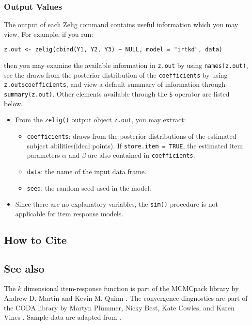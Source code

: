 \subsubsection{Output Values}

The output of each Zelig command contains useful information which you may
view. For example, if you run:
\begin{verbatim}
z.out <- zelig(cbind(Y1, Y2, Y3) ~ NULL, model = "irtkd", data)
\end{verbatim}
\noindent then you may examine the available information in \texttt{z.out} by
using \texttt{names(z.out)}, see the draws from the posterior distribution of
the \texttt{coefficients} by using \texttt{z.out\$coefficients}, and view 
a default summary of information through \texttt{summary(z.out)}. 
Other elements available through the \texttt{\$} operator are listed below.

\begin{itemize}

\item From the \texttt{zelig()} output object \texttt{z.out}, you may extract:

\begin{itemize}
\item \texttt{coefficients}: draws from the posterior distributions
of the estimated subject abilities(ideal points). If 
\texttt{store.item = TRUE}, the estimated item parameters $\alpha$ and $\beta$
 are also contained in \texttt{coefficients}.

\item \texttt{data}: the name of the input data frame.
\item \texttt{seed}: the random seed used in the model.   

\end{itemize}

\item Since there are no explanatory variables, the \texttt{sim()}
procedure is not applicable for item response models.

\end{itemize}

\subsection*{How to Cite}


\subsection*{See also}
The $k$ dimensional item-response function is part of the MCMCpack
library by Andrew D. Martin and Kevin M. Quinn \citep{MarQui05}.  The
convergence diagnostics are part of the CODA library by Martyn
Plummer, Nicky Best, Kate Cowles, and Karen Vines
\citep{PluBesCowVin05}. Sample data are adapted from \cite{MarQui05}.
